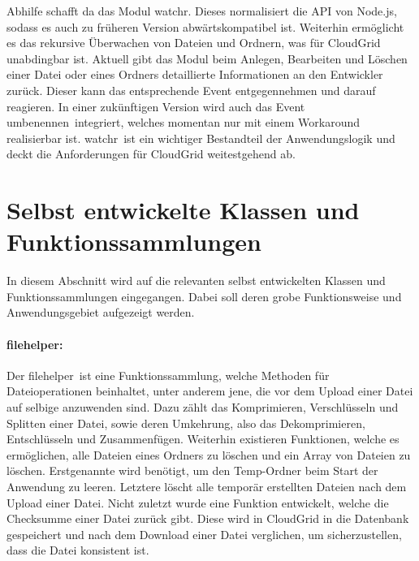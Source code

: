 Abhilfe schafft da das Modul \frqq watchr\flqq.
Dieses normalisiert die \ac{API} von Node.js, sodass es auch zu früheren Version abwärtskompatibel ist.
Weiterhin ermöglicht es das rekursive Überwachen von Dateien und Ordnern, was für CloudGrid unabdingbar ist.
Aktuell gibt das Modul beim Anlegen, Bearbeiten und Löschen einer Datei oder eines Ordners detaillierte Informationen an den Entwickler zurück.
Dieser kann das entsprechende Event entgegennehmen und darauf reagieren.
In einer zukünftigen Version wird auch das Event \frqq umbenennen\flqq\ integriert, welches momentan nur mit einem Workaround realisierbar ist.
\frqq watchr\flqq\ ist ein wichtiger Bestandteil der Anwendungslogik und deckt die Anforderungen für CloudGrid weitestgehend ab.

\section{Selbst entwickelte Klassen und Funktionssammlungen}
\label{implementierung-self-dev-classes}
In diesem Abschnitt wird auf die relevanten selbst entwickelten Klassen und Funktionssammlungen eingegangen.
Dabei soll deren grobe Funktionsweise und Anwendungsgebiet aufgezeigt werden.

\paragraph{filehelper:}
Der \frqq filehelper\flqq\ ist eine Funktionssammlung, welche Methoden für Dateioperationen beinhaltet, unter anderem jene, die vor dem Upload einer Datei auf selbige anzuwenden sind.
Dazu zählt das Komprimieren, Verschlüsseln und Splitten einer Datei, sowie deren Umkehrung, also das Dekomprimieren, Entschlüsseln und Zusammenfügen.
Weiterhin existieren Funktionen, welche es ermöglichen, alle Dateien eines Ordners zu löschen und ein Array von Dateien zu löschen.
Erstgenannte wird benötigt, um den Temp-Ordner beim Start der Anwendung zu leeren.
Letztere löscht alle temporär erstellten Dateien nach dem Upload einer Datei.
Nicht zuletzt wurde eine Funktion entwickelt, welche die Checksumme einer Datei zurück gibt.
Diese wird in CloudGrid in die Datenbank gespeichert und nach dem Download einer Datei verglichen, um sicherzustellen, dass die Datei konsistent ist.

